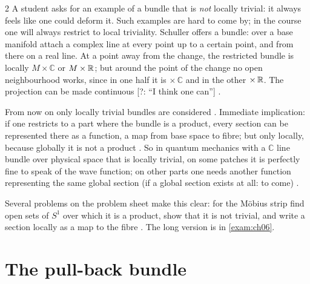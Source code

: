 \begin{paracol}{2}
A student asks for an example of a bundle that is \emph{not} locally trivial: it always feels like one could deform it. Such examples are hard to come by; in the course one will always restrict to local triviality. Schuller offers a bundle: over a base manifold attach a complex line at every point up to a certain
point, and from there on a real line. At a point away from the change, the restricted bundle is locally $M\times\mathbb C$ or $M\times\mathbb{R}$; but around the point of the change no open neighbourhood works, since in one half it is $\times\,\mathbb C$ and in the other $\times\,\mathbb{R}$. The projection can be made
continuous [?: ``I think one can''] .

From now on only locally trivial bundles are considered . Immediate implication: if one restricts to a part where the bundle is a product, every section can be represented there as a function, a map from base space to fibre; but only locally, because globally it is not a
product . So in quantum mechanics with a $\mathbb C$ line bundle over physical space that is locally trivial, on some patches it is perfectly fine to speak of the wave function; on other parts one needs another function representing the same global section (if a global section exists at all: to come)
.
\begin{exercise}\label{ex:mf-loctriv}
Several problems on the problem sheet make this clear: for the Möbius strip find open sets of $S^1$ over which it is a product, show that it is not trivial, and write a section locally as a map to the fibre . The long version is in \cref{exam:ch06}.
\end{exercise}

\section{The pull-back bundle}\label{sec:mf-pullback}


\end{paracol}
